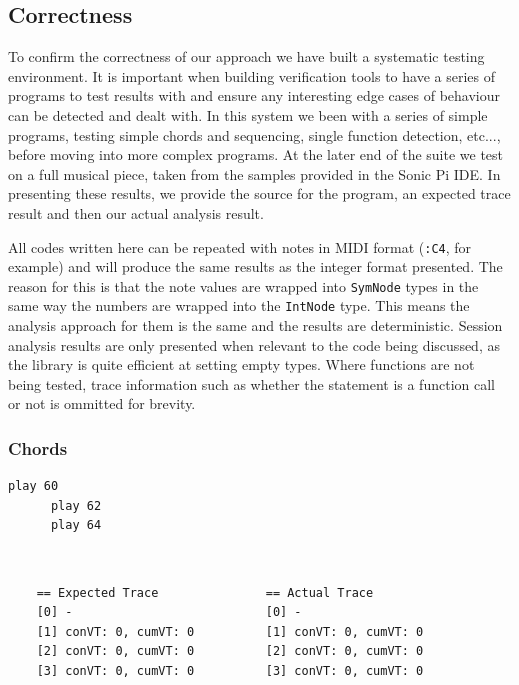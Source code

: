 \documentclass[11pt, abstracton, twoside, titlepage=true]{scrartcl}
\begin{document}


\subsection{Correctness}
To confirm the correctness of our approach we have built a systematic testing
environment. It is important when building verification tools to have a series
of programs to test results with and ensure any interesting edge cases of behaviour
can be detected and dealt with. In this system we been with a series of simple
programs, testing simple chords and sequencing, single function detection, etc...,
before moving into more complex programs. At the later end of the suite we test
on a full musical piece, taken from the samples provided in the Sonic Pi IDE. In
presenting these results, we provide the source for the program, an expected trace
result and then our actual analysis result.

All codes written here can be repeated with notes in MIDI format (\texttt{:C4}, 
for example) and will produce the same results as the integer format presented.
The reason for this is that the note values are wrapped into \texttt{SymNode} types 
in the same way the numbers are wrapped into the \texttt{IntNode} type. This means 
the analysis approach for them is the same and the results are deterministic.
Session analysis results are only presented when relevant to the code being
discussed, as the library is quite efficient at setting empty types. Where functions
are not being tested, trace information such as whether the statement is a function 
call or not is ommitted for brevity.

\subsubsection{Chords}

\begin{minipage}{\textwidth}
	\begin{lstlisting}[style = sonicpi]
      play 60
      play 62
      play 64
	\end{lstlisting}
\end{minipage}
\\
\begin{lstlisting}
    == Expected Trace               == Actual Trace
    [0] -                           [0] -
    [1] conVT: 0, cumVT: 0          [1] conVT: 0, cumVT: 0
    [2] conVT: 0, cumVT: 0          [2] conVT: 0, cumVT: 0
    [3] conVT: 0, cumVT: 0          [3] conVT: 0, cumVT: 0
\end{lstlisting}
\end{document}
